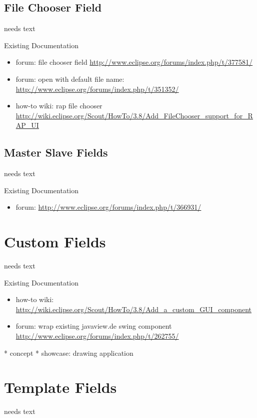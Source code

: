 \documentclass[a4paper,10pt,twoside]{book}
\begin{document}
\section{File Chooser Field}
needs text

\noindent Existing Documentation
\begin{itemize}
  \item forum: file chooser field \url{http://www.eclipse.org/forums/index.php/t/377581/}
  \item forum: open with default file name: \url{http://www.eclipse.org/forums/index.php/t/351352/}
  \item how-to wiki: rap file chooser \url {http://wiki.eclipse.org/Scout/HowTo/3.8/Add_FileChooser_support_for_RAP_UI}
\end{itemize}

\section{Master Slave Fields}
needs text

\noindent Existing Documentation
\begin{itemize}
  \item forum: \url{http://www.eclipse.org/forums/index.php/t/366931/}
\end{itemize}

\chapter{Custom Fields}

needs text

\noindent Existing Documentation
\begin{itemize}
  \item how-to wiki: \url{http://wiki.eclipse.org/Scout/HowTo/3.8/Add_a_custom_GUI_component}
  \item forum: wrap existing javaview.de swing component \url{http://www.eclipse.org/forums/index.php/t/262755/}
\end{itemize}

  * concept
  * showcase: drawing application

\chapter{Template Fields}
needs text
\end{document}
